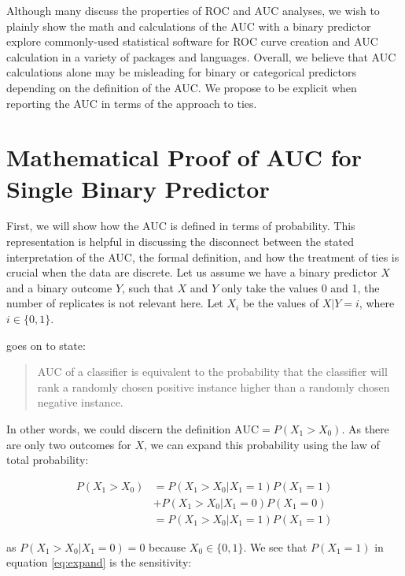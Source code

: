 \documentclass[article]{jss}
\begin{document}
Although many discuss the properties of ROC and AUC analyses, we wish to
plainly show the math and calculations of the AUC with a binary
predictor explore commonly-used statistical software for ROC curve
creation and AUC calculation in a variety of packages and languages.
Overall, we believe that AUC calculations alone may be misleading for
binary or categorical predictors depending on the definition of the AUC.
We propose to be explicit when reporting the AUC in terms of the
approach to ties.

\hypertarget{mathematical-proof-of-auc-for-single-binary-predictor}{%
\section{Mathematical Proof of AUC for Single Binary
Predictor}\label{mathematical-proof-of-auc-for-single-binary-predictor}}

First, we will show how the AUC is defined in terms of probability. This
representation is helpful in discussing the disconnect between the
stated interpretation of the AUC, the formal definition, and how the
treatment of ties is crucial when the data are discrete. Let us assume
we have a binary predictor \(X\) and a binary outcome \(Y\), such that
\(X\) and \(Y\) only take the values \(0\) and 1, the number of
replicates is not relevant here. Let \(X_{i}\) be the values of
\(X | Y = i\), where \(i \in \{0, 1\}\).

\citet{fawcett2006introduction} goes on to state:

\begin{quote}
AUC of a classifier is equivalent to the probability that the classifier
will rank a randomly chosen positive instance higher than a randomly
chosen negative instance.
\end{quote}

In other words, we could discern the definition
\(\text{AUC} = P(X_{1} > X_{0})\). As there are only two outcomes for
\(X\), we can expand this probability using the law of total
probability:

\begin{align}
P(X_{1} > X_{0}) &= P(X_{1} > X_{0} | X_{1} = 1) P(X_{1} = 1) \nonumber \\
&+ P(X_{1} > X_{0} | X_{1} = 0) P(X_{1} = 0) \label{eq:expand1} \\
&= P(X_{1} > X_{0} | X_{1} = 1) P(X_{1} = 1) \label{eq:expand}
\end{align}

as \(P(X_{1} > X_{0} | X_{1} = 0) = 0\) because \(X_{0} \in \{0, 1\}\).
We see that \(P(X_{1} = 1)\) in equation \eqref{eq:expand} is the
sensitivity:
\end{document}
